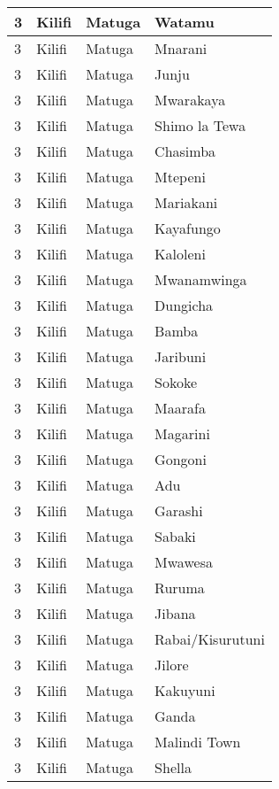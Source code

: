 \begin{table}[!ht]
\begin{tabular}{|l|l|l|l|}
        3 & Kilifi & Matuga & Watamu \\ \hline
        3 & Kilifi & Matuga & Mnarani \\ \hline
        3 & Kilifi & Matuga & Junju \\ \hline
        3 & Kilifi & Matuga & Mwarakaya \\ \hline
        3 & Kilifi & Matuga & Shimo la Tewa \\ \hline
        3 & Kilifi & Matuga & Chasimba \\ \hline
        3 & Kilifi & Matuga & Mtepeni \\ \hline
        3 & Kilifi & Matuga & Mariakani \\ \hline
        3 & Kilifi & Matuga & Kayafungo \\ \hline
        3 & Kilifi & Matuga & Kaloleni \\ \hline
        3 & Kilifi & Matuga & Mwanamwinga \\ \hline
        3 & Kilifi & Matuga & Dungicha \\ \hline
        3 & Kilifi & Matuga & Bamba \\ \hline
        3 & Kilifi & Matuga & Jaribuni \\ \hline
        3 & Kilifi & Matuga & Sokoke \\ \hline
        3 & Kilifi & Matuga & Maarafa \\ \hline
        3 & Kilifi & Matuga & Magarini \\ \hline
        3 & Kilifi & Matuga & Gongoni \\ \hline
        3 & Kilifi & Matuga & Adu \\ \hline
        3 & Kilifi & Matuga & Garashi \\ \hline
        3 & Kilifi & Matuga & Sabaki \\ \hline
        3 & Kilifi & Matuga & Mwawesa \\ \hline
        3 & Kilifi & Matuga & Ruruma \\ \hline
        3 & Kilifi & Matuga & Jibana \\ \hline
        3 & Kilifi & Matuga & Rabai/Kisurutuni \\ \hline
        3 & Kilifi & Matuga & Jilore \\ \hline
        3 & Kilifi & Matuga & Kakuyuni \\ \hline
        3 & Kilifi & Matuga & Ganda \\ \hline
        3 & Kilifi & Matuga & Malindi Town \\ \hline
        3 & Kilifi & Matuga & Shella \\ \hline

\end{tabular}
\end{table}
